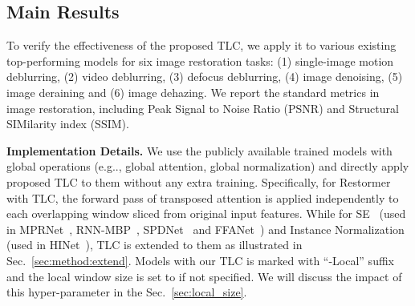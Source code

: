 \documentclass[runningheads]{llncs}
\makeatletter
\DeclareRobustCommand\onedot{\futurelet\@let@token\@onedot}
\def\@onedot{\ifx\@let@token.\else.\null\fi\xspace}
\def\eg{e.g\onedot}
\makeatother
\begin{document}
\subsection{Main Results}
To verify the effectiveness of the proposed TLC, we apply it to various existing top-performing models for six image restoration tasks: (1) single-image motion deblurring, (2) video deblurring, (3) defocus deblurring, (4) image denoising, (5) image deraining and (6) image dehazing.  We report the standard metrics in image restoration, including Peak Signal to Noise Ratio (PSNR) and Structural SIMilarity index (SSIM). 

\textbf{Implementation Details.}
We use the publicly available trained models with global operations (\eg, global attention, global normalization) and directly apply proposed TLC to them without any extra training. 
Specifically, for Restormer~\cite{zamir2021restormer} with TLC, the forward pass of transposed attention is applied independently to each overlapping window sliced from original input features. While for SE~\cite{hu2018squeeze} (used in MPRNet~\cite{Zamir2021MPRNet}, RNN-MBP~\cite{zhu2021deep}, SPDNet~\cite{fang2020multi} and FFANet~\cite{qin2020ffa}) and Instance Normalization~\cite{ulyanov2016instance} (used in HINet~\cite{chen2021hinet}), TLC is extended to them as illustrated in Sec.~\ref{sec:method:extend}.
Models with our TLC is marked with ``-Local'' suffix and the local window size is set to  if not specified. We will discuss the impact of this hyper-parameter in the Sec.~\ref{sec:local_size}.
\end{document}
